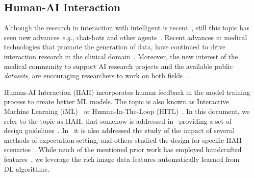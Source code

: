 \subsection{Human-AI Interaction}
\label{sec:sec00202}

Although the research in interaction with intelligent is recent~\cite{burr2018analysis}, still this topic has seen new advances {\it e.g.}, chat-bots and other agents~\cite{miller2019intrinsically}.
Recent advances in medical technologies that promote the generation of data, have continued to drive interaction research in the clinical domain~\cite{azuaje2019artificial}.
Moreover, the new interest of the medical community to support AI research projects and the available public {\it datasets}, are encouraging researchers to work on both fields~\cite{lau2018dataset}.

Human-AI Interaction (HAII) incorporates human feedback in the model training process to create better ML models.
The topic is also known as Interactive Machine Learning (iML)~\cite{10.1145/604045.604056} or Human-In-The-Loop (HITL)~\cite{holzinger2016interactive}.
In this document, we refer to the topic as HAII, that somehow is addressed in~\cite{10.1145/3290605.3300233} providing a set of design guidelines~\cite{10.1145/3132272.3134111}.
In~\cite{Kocielnik:2019:YAI:3290605.3300641} it is also addressed the study of the impact of several methods of expectation setting, and others studied the design for specific HAII scenarios~\cite{aha2017ai}.
While much of the mentioned prior work has employed handcrafted features~\cite{10.1145/3290605.3300233, Kocielnik:2019:YAI:3290605.3300641}, we leverage the rich image data features automatically learned from DL algorithms.

\break